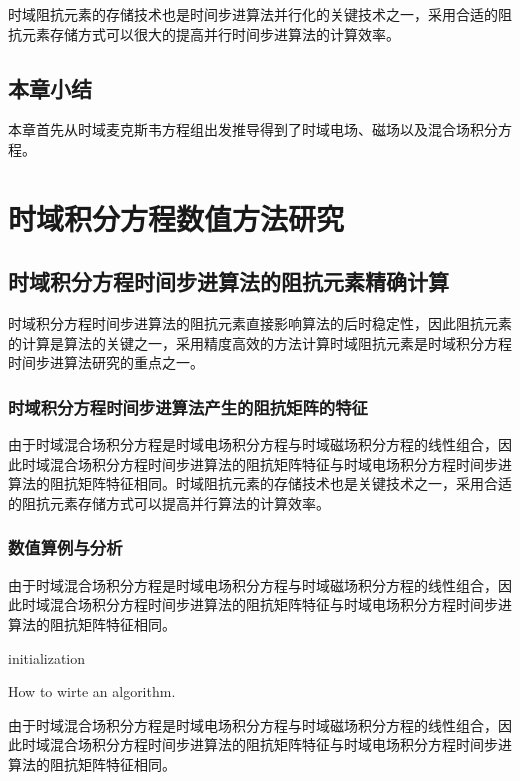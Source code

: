 \documentclass[master]{thesis-uestc}
\begin{document}
时域阻抗元素的存储技术也是时间步进算法并行化的关键技术之一，采用合适的阻抗元素存储方式可以很大的提高并行时间步进算法的计算效率。

\section{本章小结}
本章首先从时域麦克斯韦方程组出发推导得到了时域电场、磁场以及混合场积分方程。

\chapter{时域积分方程数值方法研究}
\section{时域积分方程时间步进算法的阻抗元素精确计算}
时域积分方程时间步进算法的阻抗元素直接影响算法的后时稳定性，因此阻抗元素的计算是算法的关键之一，采用精度高效的方法计算时域阻抗元素是时域积分方程时间步进算法研究的重点之一。

\subsection{时域积分方程时间步进算法产生的阻抗矩阵的特征}
由于时域混合场积分方程是时域电场积分方程与时域磁场积分方程的线性组合，因此时域混合场积分方程时间步进算法的阻抗矩阵特征与时域电场积分方程时间步进算法的阻抗矩阵特征相同。时域阻抗元素的存储技术也是关键技术之一，采用合适的阻抗元素存储方式可以提高并行算法的计算效率。

\subsection{数值算例与分析}
由于时域混合场积分方程是时域电场积分方程与时域磁场积分方程的线性组合，因此时域混合场积分方程时间步进算法的阻抗矩阵特征与时域电场积分方程时间步进算法的阻抗矩阵特征相同。

\begin{algorithm}[H]
    initialization\;
    \caption{How to wirte an algorithm.}
\end{algorithm}

由于时域混合场积分方程是时域电场积分方程与时域磁场积分方程的线性组合，因此时域混合场积分方程时间步进算法的阻抗矩阵特征与时域电场积分方程时间步进算法的阻抗矩阵特征相同。
\end{document}
